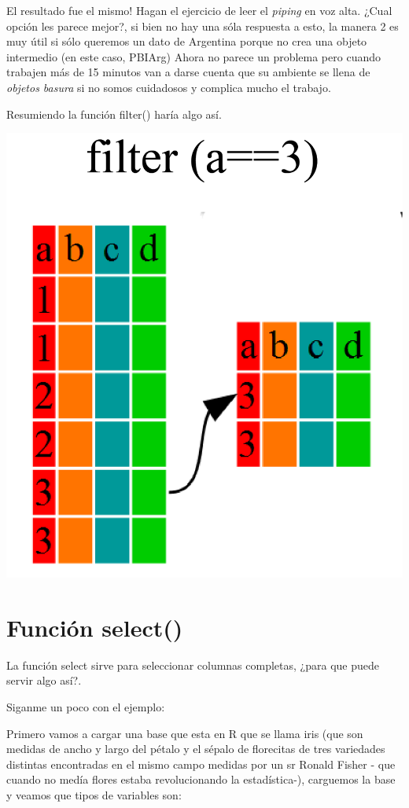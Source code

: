 \documentclass[
]{book}
\begin{document}
El resultado fue el mismo! Hagan el ejercicio de leer el \emph{piping} en voz alta. ¿Cual opción les parece mejor?, si bien no hay una sóla respuesta a esto, la manera 2 es muy útil si sólo queremos un dato de Argentina porque no crea una objeto intermedio (en este caso, PBIArg) Ahora no parece un problema pero cuando trabajen más de 15 minutos van a darse cuenta que su ambiente se llena de \emph{objetos basura} si no somos cuidadosos y complica mucho el trabajo.

Resumiendo la función filter() haría algo así.

\includegraphics[width=17.42in]{img/filter}

\hypertarget{funciuxf3n-select}{%
\section{Función select()}\label{funciuxf3n-select}}

La función select sirve para seleccionar columnas completas, ¿para que puede servir algo así?.

Siganme un poco con el ejemplo:

Primero vamos a cargar una base que esta en R que se llama iris (que son medidas de ancho y largo del pétalo y el sépalo de florecitas de tres variedades distintas encontradas en el mismo campo medidas por un sr Ronald Fisher - que cuando no medía flores estaba revolucionando la estadística-), carguemos la base y veamos que tipos de variables son:
\end{document}
